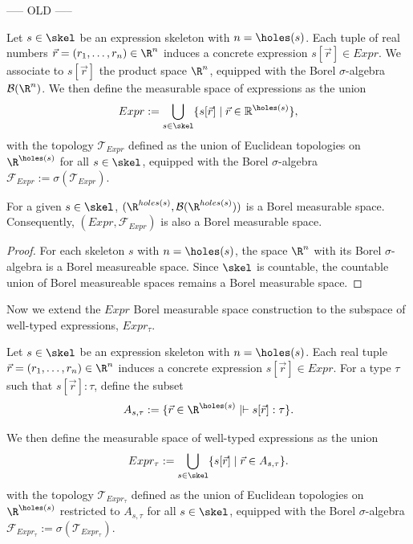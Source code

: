 {\color{red} ----- OLD -----}

\begin{definition}\label{def:meas-space}
	Let $s \in \skel$ be an expression skeleton with $n = \holes(s)$. Each tuple of real numbers $\vec{r} = (r_1, \ldots, r_n) \in \R^n$ induces a concrete expression $s[\vec{r}] \in Expr$. We associate to $s[\vec{r}]$ the product space $\R^n$, equipped with the Borel $\sigma$-algebra $\mathcal{B}(\R^n)$. We then define the measurable space of expressions as the union
	\[
		Expr := \bigcup_{s \in \skel} \{s[\vec{r}] \mid \vec{r} \in \mathbb{R}^{\holes(s)}\},
	\]
	with the topology $\mathcal{T}_{Expr}$ defined as the union of Euclidean topologies on $\R^{\holes(s)}$ for all $s \in \skel$, equipped with the Borel $\sigma$-algebra $\mathcal{F}_{Expr} := \sigma(\mathcal{T}_{Expr})$.
\end{definition}

\begin{lemma}
	For a given $s \in \skel$, $(\R^{holes(s)}, \mathcal{B}(\R^{holes(s)}))$ is a Borel measurable space. Consequently, $(Expr, \mathcal{F}_{Expr})$ is also a Borel measurable space.
\end{lemma}

\begin{proof}
	For each skeleton $s$ with $n = \holes(s)$, the space $\R^n$ with its Borel $\sigma$-algebra is a Borel measureable space. Since $\skel$ is countable, the countable union of Borel measureable spaces remains a Borel measurable space. 
\end{proof}

Now we extend the $Expr$ Borel measurable space construction to the subspace of well-typed expressions, $Expr_{\tau}$.

\begin{definition}
	Let $s \in \skel$ be an expression skeleton with $n = \holes(s)$. Each real tuple $\vec{r} = (r_1, \ldots, r_n) \in \R^n$ induces a concrete expression $s[\vec{r}] \in Expr$. For a type $\tau$ such that $s[\vec{r}] : \tau$, define the subset 
	\[
		A_{s,\tau} := \{\vec{r} \in \R^{\holes(s)} \mid \vdash s[\vec{r}] : \tau\}.
	\]

	We then define the measurable space of well-typed expressions as the union
	\[
		Expr_{\tau} := \bigcup_{s \in \skel} \{s[\vec{r}] \mid \vec{r} \in A_{s,\tau}\}.
	\]
	with the topology $\mathcal{T}_{Expr_{\tau}}$ defined as the union of Euclidean topologies on $\R^{\holes(s)}$ restricted to $A_{s,\tau}$ for all $s \in \skel$, equipped with the Borel $\sigma$-algebra $\mathcal{F}_{Expr_{\tau}} := \sigma(\mathcal{T}_{Expr_{\tau}})$.
\end{definition}

